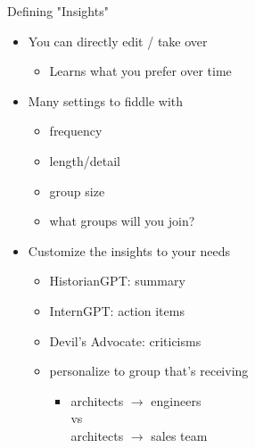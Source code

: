 \documentclass[aspectratio=35]{beamer} %
\begin{document}
\begin{frame}{Defining "Insights"}
\vspace{-1in}
\begin{itemize}
    \item You can directly edit / take over
    \begin{itemize}
        \item Learns what you prefer over time
    \end{itemize}
    \item Many settings to fiddle with
    \begin{itemize}
        \item frequency
        \item length/detail
        \item group size
        \item what groups will you join?
    \end{itemize}
    \item Customize the insights to your needs
    \begin{itemize}
        \item HistorianGPT: summary
        \item InternGPT: action items
        \item Devil's Advocate: criticisms
        \item personalize to group that's receiving
        \begin{itemize}
            \item architects $\rightarrow$ engineers\\vs\\architects $\rightarrow$ sales team
        \end{itemize}
    \end{itemize}
\end{itemize}
\end{frame}
\end{document}
